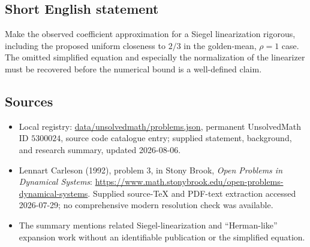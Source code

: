 \documentclass[11pt]{article}
\begin{document}
\subsection{Short English statement}
Make the observed coefficient approximation for a Siegel linearization rigorous, including the proposed uniform closeness to \(2/3\) in the golden-mean, \(\rho=1\) case. The omitted simplified equation and especially the normalization of the linearizer must be recovered before the numerical bound is a well-defined claim.
\subsection{Sources}
\begin{itemize}
\item Local registry: \url{data/unsolvedmath/problems.json}, permanent UnsolvedMath ID \(5300024\), source code catalogue entry; supplied statement, background, and research summary, updated 2026-08-06.
\item Lennart Carleson (1992), problem 3, in Stony Brook, \emph{Open Problems in Dynamical Systems}: \url{https://www.math.stonybrook.edu/open-problems-dynamical-systems}. Supplied source-TeX and PDF-text extraction accessed 2026-07-29; no comprehensive modern resolution check was available.
\item The summary mentions related Siegel-linearization and ``Herman-like'' expansion work without an identifiable publication or the simplified equation.
\end{itemize}
\end{document}
